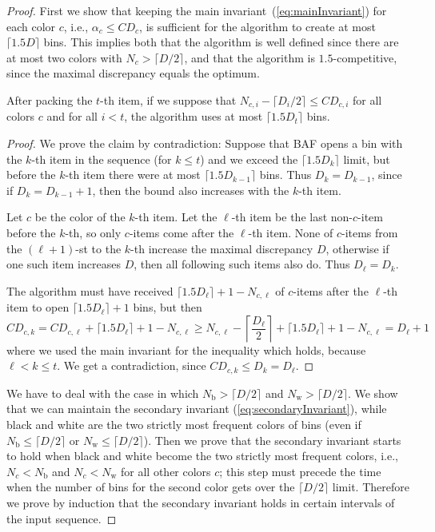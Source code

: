 \documentclass[11pt,a4paper]{article}
\def\vari#1{\mathit{#1}}
\begin{document}
\begin{proof} 
First we show that keeping the main invariant~(\ref{eq:mainInvariant})
for each color $c$, i.e., $\alpha_c \leq \vari{CD}_c$, is sufficient
for the algorithm to create at most $\lceil 1.5D\rceil$ bins. This
implies both that the algorithm is well defined since there are at
most two colors with $N_c > \lceil D/2\rceil$, and that the algorithm
is $1.5$-competitive, since the maximal discrepancy equals the optimum.

\begin{claim}
\label{cl:BAFineqForColors}
After packing the $t$-th item,
if we suppose that $N_{c,i} - \lceil D_i/2\rceil \leq \vari{CD}_{c,i}$ for all colors $c$ and for all $i<t$,
the algorithm uses at most $\lceil 1.5D_t\rceil$ bins.
\end{claim}

\begin{proof}
We prove the claim by contradiction:
Suppose that BAF opens a bin with the $k$-th item
in the sequence (for $k \leq t$) and we exceed the $\lceil 1.5D_k\rceil$ limit,
but before the $k$-th item there were at most $\lceil 1.5D_{k-1}\rceil$ bins.
Thus $D_k = D_{k-1}$, since if $D_k = D_{k-1} + 1$, then the
bound also increases with the $k$-th item.

Let $c$ be the color of the $k$-th item. Let the $\ell$-th item be the last non-$c$-item before the $k$-th, so only
$c$-items come after the $\ell$-th item.
None of $c$-items from the $(\ell + 1)$-st to the $k$-th increase the maximal discrepancy $D$,
otherwise if one such item increases $D$, then all following such items also do.
Thus $D_{\ell} = D_k$.

The algorithm must have received $\lceil 1.5D_{\ell} \rceil + 1 - N_{c,\ell}$ of
$c$-items after the $\ell$-th item to open $\lceil 1.5D_{\ell} \rceil + 1$ bins, but then
$$\vari{CD}_{c,k} = \vari{CD}_{c,\ell} + \lceil 1.5D_{\ell} \rceil + 1 - N_{c,\ell}
\geq N_{c,\ell} - \left\lceil\frac{D_{\ell}}{2}\right\rceil + \lceil 1.5D_{\ell} \rceil + 1 - N_{c,\ell}
= D_{\ell} + 1$$
where we used the main invariant for the inequality which holds, because $\ell < k \leq t$.
We get a contradiction, since $\vari{CD}_{c,k} \leq D_{k} = D_{\ell}$.
\end{proof}

We have to deal with the case in which $N_{\mathrm{b}} > \lceil D/2\rceil$ and
$N_{\mathrm{w}} > \lceil D/2\rceil$.  We show that we can maintain the
secondary invariant (\ref{eq:secondaryInvariant}), while black and
white are the two strictly most frequent colors of bins
(even if $N_{\mathrm{b}} \leq \lceil D/2\rceil$ or
$N_{\mathrm{w}} \leq \lceil D/2\rceil$). Then we prove
that the secondary invariant starts to hold when black and white
become the two strictly most frequent colors, i.e.,
$N_c < N_{\mathrm{b}}$ and $N_c < N_{\mathrm{w}}$ for all other colors $c$;
this step must precede the time when the number of bins for the second color gets over the
$\lceil D/2\rceil$ limit.
Therefore we prove by induction that the secondary invariant holds
in certain intervals of the input sequence.


\end{proof}
\end{document}
